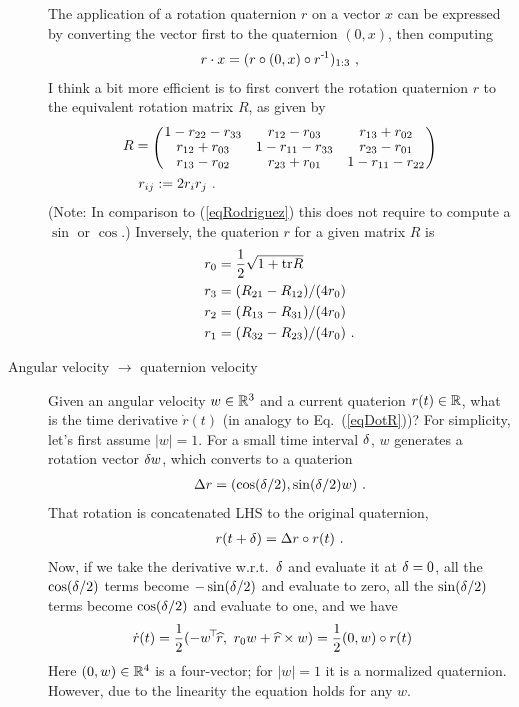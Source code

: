 \begin{description}
The application of a rotation quaternion $r$ on a vector $x$ can be expressed
by converting the vector first to the quaternion $(0,x)$, then computing
\begin{align}
r \cdot x = (r \circ (0,x) \circ r^{{\hspace*{-.0pt}\text{\rm -}\hspace*{-.5pt}}1})_{1:3} ~,
\end{align}
I think a bit more efficient is to first convert the rotation
quaternion $r$ to the equivalent rotation matrix $R$, as given by
\begin{align}
R
 &= \mat{ccc}{
    1-r_{22}-r_{33} & r_{12}-r_{03} &    r_{13}+r_{02} \\
    r_{12}+r_{03} &   1-r_{11}-r_{33} &  r_{23}-r_{01} \\
    r_{13}-r_{02} &   r_{23}+r_{01} &    1-r_{11}-r_{22}
    } \feed & ~ r_{ij} := 2 r_i r_j ~.
\end{align}
(Note: In comparison to (\ref{eqRodriguez}) this does not require to
compute a $\sin$ or $\cos$.) Inversely, the quaterion $r$ for a given
matrix $R$ is
\begin{align}
    r_0 &= \frac{1}{2}\sqrt{1+{\rm tr} R}\\
    r_3 &= (R_{21}-R_{12})/(4 r_0)\\
    r_2 &= (R_{13}-R_{31})/(4 r_0)\\
    r_1 &= (R_{32}-R_{23})/(4 r_0) ~.
\end{align}

\item[Angular velocity $\to$ quaternion velocity] Given an
    angular velocity $w\in{\mathbb{R}}^3$ and a current quaterion
    $r(t)\in{\mathbb{R}}$, what is the time derivative $\dot r(t)$ (in analogy
    to Eq.~(\ref{eqDotR}))? For simplicity, let's first assume
    $|w|=1$. For a small time interval $\delta$, $w$ generates a
    rotation vector $\delta w$, which converts to a quaterion
\begin{align}
\Delta r = (\cos(\delta/2), \sin(\delta/2) w) ~.
\end{align}
    That rotation is concatenated LHS to the original quaternion,
\begin{align}
r(t+\delta)
 = \Delta r \circ r(t) ~.
\end{align}
   Now, if we take the derivative w.r.t.\ $\delta$ and evaluate it at
   $\delta=0$, all the $\cos(\delta/2)$ terms become $-\sin(\delta/2)$ and evaluate
   to zero, all the $\sin(\delta/2)$ terms become $\cos(\delta/2)$ and evaluate
   to one, and we have
\begin{align}
\dot r(t)
&= \frac{1}{2}( - w^{\!\top\!} \widehat r,~  r_0 w + \widehat r \times w )
 = \frac{1}{2} (0,w) \circ r(t)
\end{align}
Here $(0,w)\in{\mathbb{R}}^4$ is a four-vector; for $|w|=1$ it is a normalized
quaternion. However, due to the linearity the equation holds for
any $w$.


\end{description}
